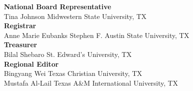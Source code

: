 \documentclass{article}
\begin{document}
{\parindent0pt
\textbf{National Board Representative}\\
Tina Johnson \dotfill Midwestern State University, TX\\ 
\textbf{Registrar}\\
Anne Marie Eubanks \dotfill Stephen F. Austin State University, TX\\
\textbf{Treasurer}\\
Bilal Shebaro \dotfill St. Edward's University, TX\\
\textbf{Regional Editor}\\
Bingyang Wei \dotfill Texas Christian University, TX\\
Mustafa Al-Lail \dotfill Texas A\&M International University, TX\\
}
\end{document}
